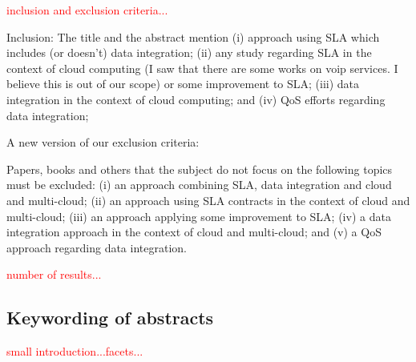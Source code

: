 \textcolor{red}{inclusion and exclusion criteria...}

Inclusion: The title and the abstract mention (i) approach using SLA which includes (or doesn't) data integration; (ii) any study regarding SLA in the context of cloud computing (I saw that there are some works on voip services. I believe this is out of our scope) or some improvement to SLA; (iii) data integration in the context of cloud computing; and (iv) QoS efforts regarding data integration;

A new version of our exclusion criteria:

Papers, books and others that the subject do not focus on the following topics must be excluded:
(i) an approach combining SLA, data integration and cloud and multi-cloud;
(ii) an approach using SLA contracts in the context of cloud and multi-cloud;
(iii) an approach applying some improvement to SLA;
(iv) a data integration approach in the context of cloud and multi-cloud; and
(v) a QoS approach regarding data integration.

\textcolor{red}{number  of results...}

\subsection{Keywording of abstracts}

\textcolor{red}{small introduction...facets...}

